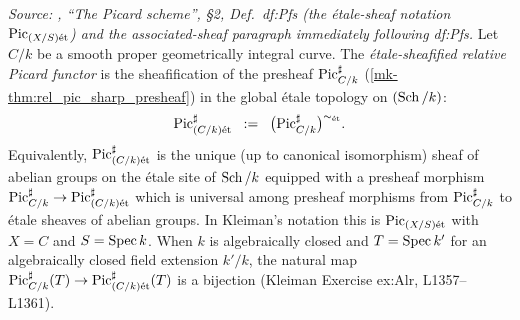 \begin{definition}\label{mk-def:rel_pic_etale_sheafification}
  \leanok

  \textit{Source: \cite{kleiman-picard}, ``The Picard scheme'', \S 2,
  Def.~df:Pfs (the \'etale-sheaf notation \(\operatorname{Pic}_{(X/S)\mathrm{\acute{e}t}}\)) and the
  associated-sheaf paragraph immediately following df:Pfs.}
  Let \(C/k\) be a smooth proper geometrically integral curve. The
  \emph{\'etale-sheafified relative Picard functor} is the sheafification of
  the presheaf \(\operatorname{Pic}^\sharp_{C/k}\) (\ref{mk-thm:rel_pic_sharp_presheaf}) in the
  global \'etale topology on \((\operatorname{Sch}/k)\):
  \[
    \operatorname{Pic}^\sharp_{(C/k)\mathrm{\acute{e}t}} \;\;:=\;\;
       \bigl(\operatorname{Pic}^\sharp_{C/k}\bigr)^{\sim_{\mathrm{\acute{e}t}}}.
  \]
  Equivalently, \(\operatorname{Pic}^\sharp_{(C/k)\mathrm{\acute{e}t}}\) is the unique (up to canonical
  isomorphism) sheaf of abelian groups on the \'etale site of \(\operatorname{Sch}/k\)
  equipped with a presheaf morphism $\operatorname{Pic}^\sharp_{C/k} \to
  \operatorname{Pic}^\sharp_{(C/k)\mathrm{\acute{e}t}}$ which is universal among presheaf morphisms from
  \(\operatorname{Pic}^\sharp_{C/k}\) to \'etale sheaves of abelian groups. In Kleiman's
  notation this is \(\operatorname{Pic}_{(X/S)\mathrm{\acute{e}t}}\) with \(X = C\) and \(S = \operatorname{Spec} k\). When \(k\)
  is algebraically closed and \(T = \operatorname{Spec} k'\) for an algebraically closed field
  extension \(k'/k\), the natural map
  \(\operatorname{Pic}^\sharp_{C/k}(T) \to \operatorname{Pic}^\sharp_{(C/k)\mathrm{\acute{e}t}}(T)\) is a bijection (Kleiman
  Exercise ex:Alr, L1357--L1361).
\end{definition}

